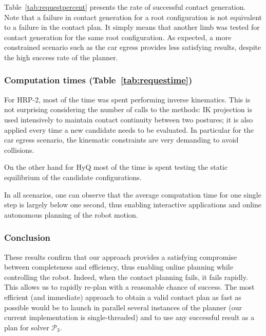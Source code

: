 Table~\ref{tab:requestpercent} presents the rate of successful contact generation. Note that a failure in contact generation for a root configuration is not equivalent to a failure in the contact plan. It simply means that another limb was tested for contact generation for the same root configuration.
As expected, a more constrained scenario such as the car egress provides less satisfying results, despite the high success rate of the planner.

\subsubsection{Computation times (Table~\ref{tab:requestime})}

For HRP-2, most of the time was spent performing inverse kinematics.
This is not surprising considering the number of calls to the methods: IK projection is used intensively to maintain contact continuity between two postures; 
it is also applied every time a new candidate needs to be evaluated. In particular for the car egress scenario,
the kinematic constraints are very demanding to avoid collisions.

On the other hand for HyQ most of the time is spent testing the static equilibrium of the candidate configurations.

In all scenarios, one can observe that the average computation time for one single step is largely below one second,
thus enabling \gls{interactive} applications and online autonomous planning of the robot motion.

\subsubsection*{Conclusion}
These results confirm that our approach provides a satisfying compromise between completeness and efficiency, thus enabling online planning
while controlling the robot. Indeed, when the contact planning fails, it fails rapidly. This allows us to rapidly re-plan with a reasonable chance of success.
The most efficient (and immediate) approach to obtain a valid contact plan as fast as possible would be to launch in parallel several instances of the planner (our current implementation is single-threaded) and to use any successful result as a plan for solver $\mathcal{P}_3$.


